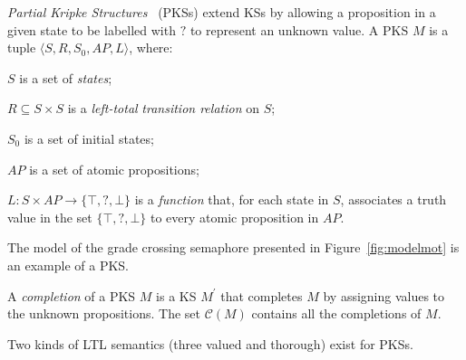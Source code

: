 \emph{Partial Kripke Structures}~\cite{bruns1999model}  (PKSs) extend KSs by allowing a proposition in a given state to be labelled with $?$ to represent an unknown value. 
A PKS $M$ is a tuple $\langle S, R,S_0,AP,L \rangle$,
where:
\begin{enumerate*}
\item[] $S$ is a set of \emph{states};
\item[] $R\subseteq S\times S$ is a \emph{left-total} \emph{transition relation} on $S$;
\item[] $S_0$ is a set of initial states;
\item[] $AP$ is a set of atomic propositions;
\item[] $L: S\times AP\rightarrow \{\top,?,\bot\}$ is a \emph{function} that, for each state in $S$, associates a truth value in the set $\{\top,?,\bot\}$ to every atomic proposition in $AP$.
\end{enumerate*}  
The model of the grade crossing semaphore presented in Figure~\ref{fig:modelmot}  is an example of a PKS.

A \emph{completion} of a PKS $M$ is a KS $M^\prime$ that completes $M$ by assigning values to the unknown propositions.
The set $\mathcal{C}(M)$ contains all the completions of $M$.

Two kinds of LTL semantics (three valued and thorough) exist for  PKSs. 


